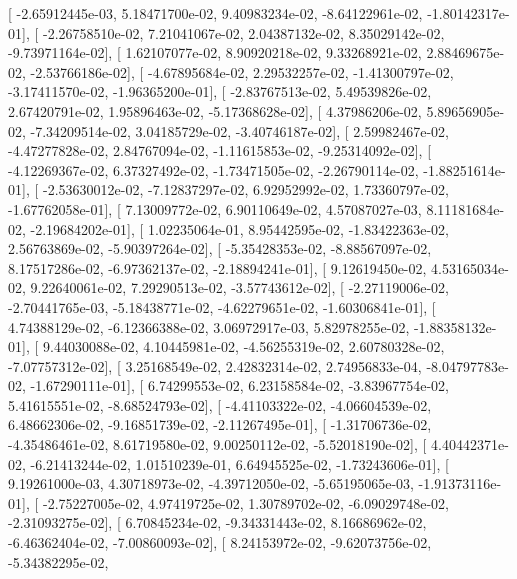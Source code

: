 \documentclass{article}
\begin{document}
       [ -2.65912445e-03,   5.18471700e-02,   9.40983234e-02,
         -8.64122961e-02,  -1.80142317e-01],
       [ -2.26758510e-02,   7.21041067e-02,   2.04387132e-02,
          8.35029142e-02,  -9.73971164e-02],
       [  1.62107077e-02,   8.90920218e-02,   9.33268921e-02,
          2.88469675e-02,  -2.53766186e-02],
       [ -4.67895684e-02,   2.29532257e-02,  -1.41300797e-02,
         -3.17411570e-02,  -1.96365200e-01],
       [ -2.83767513e-02,   5.49539826e-02,   2.67420791e-02,
          1.95896463e-02,  -5.17368628e-02],
       [  4.37986206e-02,   5.89656905e-02,  -7.34209514e-02,
          3.04185729e-02,  -3.40746187e-02],
       [  2.59982467e-02,  -4.47277828e-02,   2.84767094e-02,
         -1.11615853e-02,  -9.25314092e-02],
       [ -4.12269367e-02,   6.37327492e-02,  -1.73471505e-02,
         -2.26790114e-02,  -1.88251614e-01],
       [ -2.53630012e-02,  -7.12837297e-02,   6.92952992e-02,
          1.73360797e-02,  -1.67762058e-01],
       [  7.13009772e-02,   6.90110649e-02,   4.57087027e-03,
          8.11181684e-02,  -2.19684202e-01],
       [  1.02235064e-01,   8.95442595e-02,  -1.83422363e-02,
          2.56763869e-02,  -5.90397264e-02],
       [ -5.35428353e-02,  -8.88567097e-02,   8.17517286e-02,
         -6.97362137e-02,  -2.18894241e-01],
       [  9.12619450e-02,   4.53165034e-02,   9.22640061e-02,
          7.29290513e-02,  -3.57743612e-02],
       [ -2.27119006e-02,  -2.70441765e-03,  -5.18438771e-02,
         -4.62279651e-02,  -1.60306841e-01],
       [  4.74388129e-02,  -6.12366388e-02,   3.06972917e-03,
          5.82978255e-02,  -1.88358132e-01],
       [  9.44030088e-02,   4.10445981e-02,  -4.56255319e-02,
          2.60780328e-02,  -7.07757312e-02],
       [  3.25168549e-02,   2.42832314e-02,   2.74956833e-04,
         -8.04797783e-02,  -1.67290111e-01],
       [  6.74299553e-02,   6.23158584e-02,  -3.83967754e-02,
          5.41615551e-02,  -8.68524793e-02],
       [ -4.41103322e-02,  -4.06604539e-02,   6.48662306e-02,
         -9.16851739e-02,  -2.11267495e-01],
       [ -1.31706736e-02,  -4.35486461e-02,   8.61719580e-02,
          9.00250112e-02,  -5.52018190e-02],
       [  4.40442371e-02,  -6.21413244e-02,   1.01510239e-01,
          6.64945525e-02,  -1.73243606e-01],
       [  9.19261000e-03,   4.30718973e-02,  -4.39712050e-02,
         -5.65195065e-03,  -1.91373116e-01],
       [ -2.75227005e-02,   4.97419725e-02,   1.30789702e-02,
         -6.09029748e-02,  -2.31093275e-02],
       [  6.70845234e-02,  -9.34331443e-02,   8.16686962e-02,
         -6.46362404e-02,  -7.00860093e-02],
       [  8.24153972e-02,  -9.62073756e-02,  -5.34382295e-02,
\end{document}

